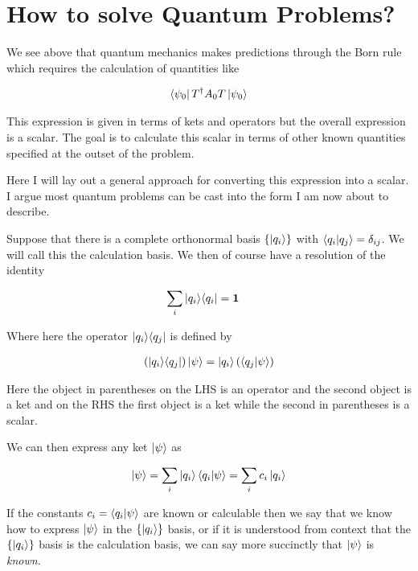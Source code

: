 \documentclass[12pt]{article}
\newcommand{\bv}[1]{\boldsymbol{#1}}
\newcommand{\ketbra}[2]{\Ket{#1}\!\Bra{#2}}
\begin{document}
\section{How to solve Quantum Problems?}


We see above that quantum mechanics makes predictions through the Born rule which requires the calculation of quantities like

\begin{align}
\bra{\psi_0}T^{\dag}A_0T \ket{\psi_0}
\end{align}

This expression is given in terms of kets and operators but the overall expression is a scalar. The goal is to calculate this scalar in terms of other known quantities specified at the outset of the problem.

Here I will lay out a general approach for converting this expression into a scalar. I argue most quantum problems can be cast into the form I am now about to describe.

Suppose that there is a complete orthonormal basis $\{\ket{q_i}\}$ with $\braket{q_i|q_j} = \delta_{ij}$. We will call this the calculation basis. We then of course have a resolution of the identity

\begin{align}
\sum_{i} \ketbra{q_i}{q_i} &= \bv{1}
\end{align}

Where here the operator $\ketbra{q_i}{q_j}$ is defined by

\begin{align}
\left(\ketbra{q_i}{q_j}\right) \ket{\psi} = \ket{q_i} 
\left(\braket{q_j|\psi}\right)
\end{align}

Here the object in parentheses on the LHS is an operator and the second object is a ket and on the RHS the first object is a ket while the second in parentheses is a scalar.


We can then express any ket $\ket{\psi}$ as

\begin{align}
\ket{\psi} = \sum_{i} \ket{q_i} \braket{q_i|\psi} = \sum_i c_i \ket{q_i}
\end{align}

If the constants $c_i = \braket{q_i|\psi}$ are known or calculable then we say that we know how to express $\ket{\psi}$ in the $\{\ket{q_i}\}$ basis, or if it is understood from context that the $\{\ket{q_i}\}$ basis is the calculation basis, we can say more succinctly that $\ket{\psi}$ is \textit{known}.
\end{document}
